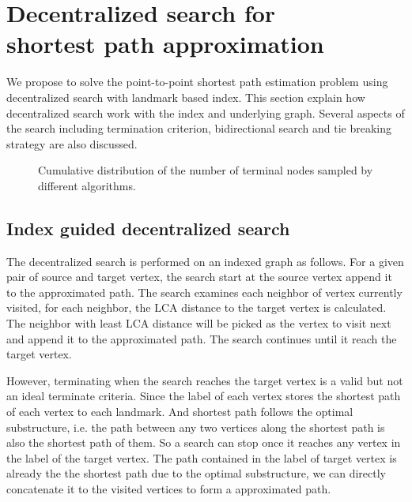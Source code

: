 \section{Decentralized search for \\ shortest path approximation}
\label{searching}

We propose to solve the point-to-point shortest path estimation problem using decentralized search with landmark based index. This section explain how decentralized search work with the index and underlying graph. Several aspects of the search including termination criterion, bidirectional search and tie breaking strategy are also discussed. 

\begin{figure*}[t]
    \centering
    \caption{Cumulative distribution of the number of terminal nodes sampled by different algorithms.}
    \label{fig:cum_dis}
\end{figure*}

\subsection{Index guided decentralized search}

The decentralized search is performed on an indexed graph as follows. For a given pair of source and target vertex, the search start at the source vertex append it to the approximated path. The search examines each neighbor of vertex currently visited, for each neighbor, the LCA distance to the target vertex is calculated. The neighbor with least LCA distance will be picked as the vertex to visit next and append it to the approximated path. The search continues until it reach the target vertex. 

However, terminating when the search reaches the target vertex is a valid but not an ideal terminate criteria. Since the label of each vertex stores the shortest path of each vertex to each landmark. And shortest path follows the optimal substructure, i.e. the path between any two vertices along the shortest path is also the shortest path of them. So a search can stop once it  reaches any vertex in the label of the target vertex. The path contained in the label of target vertex is already the the shortest path due to the optimal substructure, we can directly concatenate it to the visited vertices to form a approximated path. 

